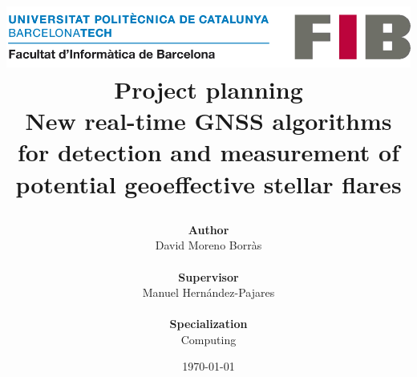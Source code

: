 \title{
	{
	\includegraphics[width=0.7\linewidth]{images/logo-fib.png}	
	\vspace{1cm}
	\textbf{\\Project planning} \\
	\large New real-time GNSS algorithms for detection and measurement of potential geoeffective stellar flares}
\author{\textbf{Author}\\
	David Moreno Borr\`as
	\\ \\
	\textbf{Supervisor}\\
	 Manuel Hernández-Pajares
	 \\ \\
	\textbf{Specialization}\\
	Computing
} 
	\vspace{1.3cm}
\date{\today}
}
\maketitle
\thispagestyle{empty}